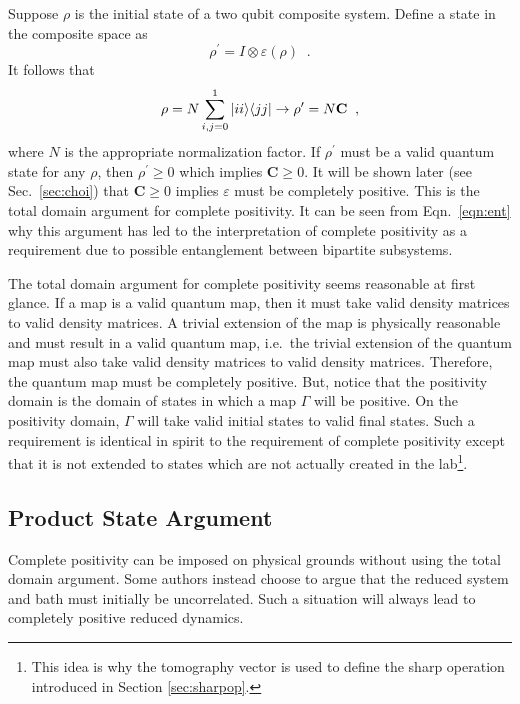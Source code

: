 Suppose $\rho$ is the initial state of a two qubit composite system.  Define a state in the composite space as
 \begin{equation}
\rho^\prime = I\otimes\varepsilon\left(\rho\right)\;\;.
\end{equation}
It follows that
\begin{equation}
\label{eqn:ent}
\rho = N\sum_{i,j=0}^1|ii\rangle\langle jj| \rightarrow \rho^\prime = N\mathbf{C}\;\;,
\end{equation}
 where $N$ is the appropriate normalization factor.  If $\rho^\prime$ must be a valid quantum state for any $\rho$, then $\rho^\prime\ge 0$ which implies $\mathbf{C}\ge 0$.  It will be shown later (see Sec.\ \ref{sec:choi}) that $\mathbf{C}\ge 0$ implies $\varepsilon$ must be completely positive.  This is the total domain argument for complete positivity.  It can be seen from Eqn.\ \ref{eqn:ent} why this argument has led to the interpretation of complete positivity as a requirement due to possible entanglement between bipartite subsystems.

The total domain argument for complete positivity seems reasonable at first glance.  If a map is a valid quantum map, then it must take valid density matrices to valid density matrices.  A trivial extension of the map is physically reasonable and must result in a valid quantum map, i.e.\ the trivial extension of the quantum map must also take valid density matrices to valid density matrices.  Therefore, the quantum map must be completely positive.  But, notice that the positivity domain is the domain of states in which a map $\Gamma$ will be positive.  On the positivity domain, $\Gamma$ will take valid initial states to valid final states.  Such a requirement is identical in spirit to the requirement of complete positivity except that it is not extended to states which are not actually created in the lab\footnote{This idea is why the tomography vector is used to define the sharp operation introduced in Section \ref{sec:sharpop}.}. 

\subsection{Product State Argument}

Complete positivity can be imposed on physical grounds without using the total domain argument.  Some authors instead choose to argue that the reduced system and bath must initially be uncorrelated.  Such a situation will always lead to completely positive reduced dynamics. 

